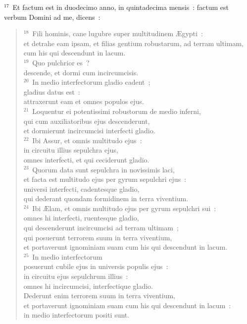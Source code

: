 ${}^{17}$~Et factum est in duodecimo anno, in quintadecima mensis~: factum est verbum Domini ad me, dicens~:
\begin{flushleft}\begin{verse}${}^{18}$~Fili hominis, cane lugubre super multitudinem \AE gypti~:\\ et detrahe eam ipsam, et filias gentium robustarum, ad terram ultimam,\\ cum his qui descendunt in lacum.\\
${}^{19}$~Quo pulchrior es~?\\ descende, et dormi cum incircumcisis.\\
${}^{20}$~In medio interfectorum gladio cadent~;\\ gladius datus est~:\\ attraxerunt eam et omnes populos ejus.\\
${}^{21}$~Loquentur ei potentissimi robustorum de medio inferni,\\ qui cum auxiliatoribus ejus descenderunt,\\ et dormierunt incircumcisi interfecti gladio.\\
${}^{22}$~Ibi Assur, et omnis multitudo ejus~:\\ in circuitu illius sepulchra ejus,\\ omnes interfecti, et qui ceciderunt gladio.\\
${}^{23}$~Quorum data sunt sepulchra in novissimis laci,\\ et facta est multitudo ejus per gyrum sepulchri ejus~:\\ universi interfecti, cadentesque gladio,\\ qui dederant quondam formidinem in terra viventium.\\
${}^{24}$~Ibi \AE lam, et omnis multitudo ejus per gyrum sepulchri sui~:\\ omnes hi interfecti, ruentesque gladio,\\ qui descenderunt incircumcisi ad terram ultimam~;\\ qui posuerunt terrorem suum in terra viventium,\\ et portaverunt ignominiam suam cum his qui descendunt in lacum.\\
${}^{25}$~In medio interfectorum\\ posuerunt cubile ejus in universis populis ejus~:\\ in circuitu ejus sepulchrum illius~:\\ omnes hi incircumcisi, interfectique gladio.\\ Dederunt enim terrorem suum in terra viventium,\\ et portaverunt ignominiam suam cum his qui descendunt in lacum~:\\ in medio interfectorum positi sunt.\\

\end{verse}
\end{flushleft}

